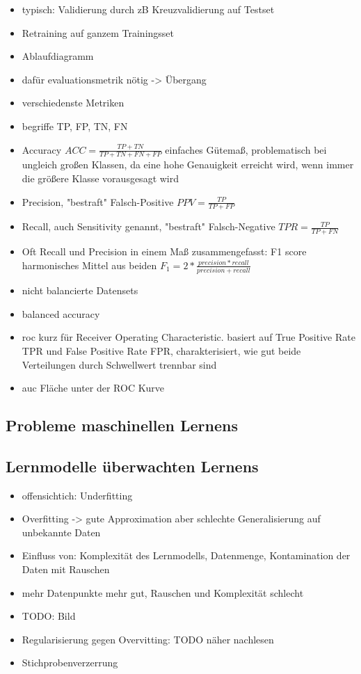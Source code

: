 \begin{itemize}
		\item typisch: Validierung durch zB Kreuzvalidierung auf Testset
		\item Retraining auf ganzem Trainingsset
		\item Ablaufdiagramm
		\item dafür evaluationsmetrik nötig -> Übergang
		\item verschiedenste Metriken
		\item begriffe TP, FP, TN, FN
		\item Accuracy $ACC = \frac{TP + TN}{TP + TN + FN + FP}$ einfaches Gütemaß, problematisch bei ungleich großen Klassen, da eine hohe Genauigkeit erreicht wird, wenn immer die größere Klasse vorausgesagt wird
		\item Precision, "bestraft" Falsch-Positive $PPV = \frac{TP}{TP + FP}$
		\item Recall, auch Sensitivity genannt, "bestraft" Falsch-Negative $TPR = \frac{TP}{TP + FN}$
		\item Oft Recall und Precision in einem Maß zusammengefasst: F1 score harmonisches Mittel aus beiden $F_1 = 2 * \frac{precision * recall}{precision + recall}$
		\item nicht balancierte Datensets
		\item balanced accuracy
		\item roc kurz für Receiver Operating Characteristic. basiert auf True Positive Rate TPR und False Positive Rate FPR, charakterisiert, wie gut beide Verteilungen durch Schwellwert trennbar sind
		\item auc Fläche unter der ROC Kurve
	\end{itemize}
	
	\subsection{Probleme maschinellen Lernens}
	
	\subsection{Lernmodelle überwachten Lernens}
		
		\begin{itemize}
			\item offensichtich: Underfitting
			\item Overfitting -> gute Approximation aber schlechte Generalisierung auf unbekannte Daten
			\item Einfluss von: Komplexität des Lernmodells, Datenmenge, Kontamination der Daten mit Rauschen
			\item mehr Datenpunkte mehr gut, Rauschen und Komplexität schlecht
			\item TODO: Bild
			\item Regularisierung gegen Overvitting: TODO näher nachlesen
			\item Stichprobenverzerrung
		\end{itemize}
	
